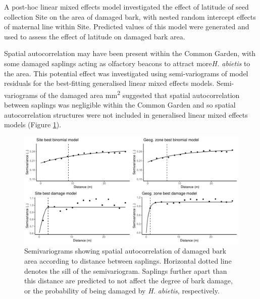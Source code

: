 \documentclass[a4paper, 11pt]{article}
\begin{document}
A post-hoc linear mixed effects model investigated the effect of latitude of seed collection Site on the area of damaged bark, with nested random intercept effects of maternal line within Site. Predicted values of this model were generated and used to assess the effect of latitude on damaged bark area. 

Spatial autocorrelation may have been present within the Common Garden, with some damaged saplings acting as olfactory beacons to attract more\textit{H. abietis} to the area. This potential effect was investigated using semi-variograms of model residuals for the best-fitting generalised linear mixed effects models. Semi-variograms of the damaged area mm\textsuperscript{2} suggested that spatial autocorrelation between saplings was negligible within the Common Garden and so spatial autocorrelation structures were not included in generalised linear mixed effects models (Figure \ref{semivariogram_all}).

\begin{figure}[H]
	\includegraphics[width=\textwidth]{semivariogram_all}
	\caption{Semivariograms showing spatial autocorrelation of damaged bark area according to distance between saplings. Horizontal dotted line denotes the sill of the semivariogram. Saplings further apart than this distance are predicted to not affect the degree of bark damage, or the probability of being damaged by \textit{H. abietis}, respectively.}
	\label{semivariogram_all}
\end{figure}
\end{document}
